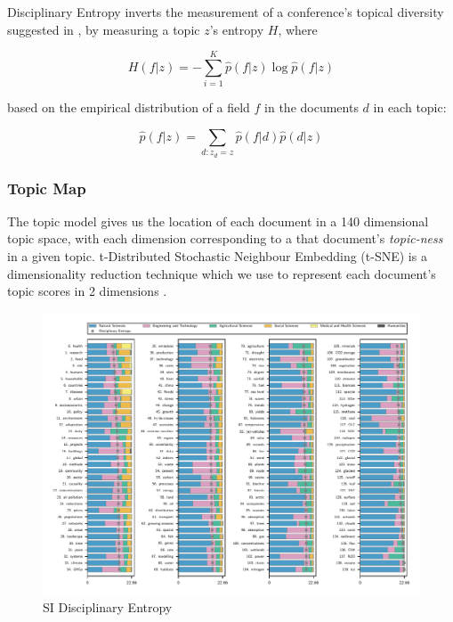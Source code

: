 \documentclass{article}
\begin{document}
\begin{linenumbers}
	Disciplinary Entropy inverts the measurement of a conference's topical diversity suggested in \cite{Hall2008}, by measuring a topic \(z\)'s entropy \(H\), where 
	
	\begin{equation}
		H(f|z) = -\sum_{i=1}^K \hat{p}(f|z) \log \hat{p}(f|z) 
	\end{equation}
	
	based on the empirical distribution of a field \(f\) in the documents \(d\) in each topic:
	
	\begin{equation}
		\hat{p}(f|z) = \sum_{d:z_d=z} \hat{p} (f|d) \hat{p} (d|z)
	\end{equation}
	
	\subsubsection*{Topic Map}
	The topic model gives us the location of each document in a 140 dimensional topic space, with each dimension corresponding to a that document's \textit{topic-ness} in a given topic. t-Distributed Stochastic Neighbour Embedding (t-SNE) is a dimensionality reduction technique which we use to represent each document's topic scores in 2 dimensions \cite{vandermaaten2008}.

	\begin{figure}
		\begin{center}
			\includegraphics[width=1\linewidth]{plots_pub/topic_oecd_entropy.pdf}
			\caption{SI Disciplinary Entropy}
			\label{dis-entropy}
		\end{center}
	\end{figure}	
	

\end{linenumbers}
\end{document}
